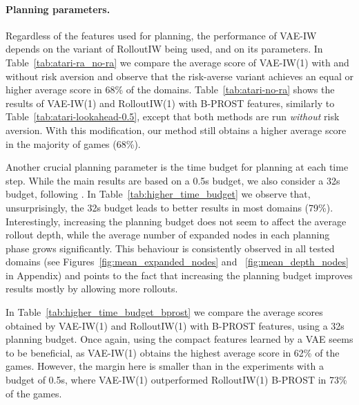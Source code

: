 \paragraph{Planning parameters.}
Regardless of the features used for planning, the performance of VAE-IW depends on the variant of RolloutIW being used, and on its parameters. 
In Table~\ref{tab:atari-ra_no-ra} we compare the average score of VAE-IW(1) with and without risk aversion and observe that the risk-averse variant achieves an equal or higher average score in 68\% of the domains.
%
Table~\ref{tab:atari-no-ra} shows the results of VAE-IW(1) and RolloutIW(1) with B-PROST features, similarly to Table~\ref{tab:atari-lookahead-0.5}, except that both methods are run \emph{without} risk aversion. With this modification, our method still obtains a higher average score in the majority of games (68\%).

Another crucial planning parameter is the time budget for planning at each time step. While the main results are based on a 0.5s budget, we also consider a 32s budget, following \citet{rolloutiw-orginal}. In Table~\ref{tab:higher_time_budget} we observe that, unsurprisingly, the 32s budget leads to better results in most domains (79\%). 
Interestingly, increasing the planning budget does not seem to affect the average rollout depth, while the average number of expanded nodes in each planning phase grows significantly. This behaviour is consistently observed in all tested domains (see Figures~\ref{fig:mean_expanded_nodes} and ~\ref{fig:mean_depth_nodes} in Appendix) and points to the fact that increasing the planning budget improves results mostly by allowing more rollouts.

In Table~\ref{tab:higher_time_budget_bprost} we compare the average scores obtained by VAE-IW(1) and RolloutIW(1) with B-PROST features, using a 32s planning budget. Once again, using the compact features learned by a VAE seems to be beneficial, as VAE-IW(1) obtains the highest average score in 62\% of the games. However, the margin here is smaller than in the experiments with a budget of 0.5s, where VAE-IW(1) outperformed RolloutIW(1) B-PROST in 73\% of the games.
